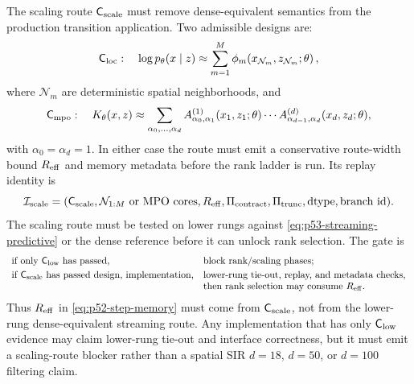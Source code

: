 \documentclass[11pt]{article}
\numberwithin{equation}{section}
\begin{document}
The scaling route \(\mathsf C_{\rm scale}\) must remove dense-equivalent
semantics from the production transition application.  Two admissible designs
are:
\begin{equation}
    \mathsf C_{\rm loc}:
    \quad
    \log p_\theta(x\mid z)
    \approx
    \sum_{m=1}^{M}
    \phi_m\!\left(x_{\mathcal N_m},z_{\mathcal N_m};\theta\right),
    \label{eq:p53-local-transition-factor}
\end{equation}
where \(\mathcal N_m\) are deterministic spatial neighborhoods, and
\begin{equation}
    \mathsf C_{\rm mpo}:
    \quad
    K_\theta(x,z)
    \approx
    \sum_{\alpha_0,\ldots,\alpha_d}
    A^{(1)}_{\alpha_0,\alpha_1}(x_1,z_1;\theta)
    \cdots
    A^{(d)}_{\alpha_{d-1},\alpha_d}(x_d,z_d;\theta),
    \label{eq:p53-mpo-transition-factor}
\end{equation}
with \(\alpha_0=\alpha_d=1\).  In either case the route must emit a conservative
route-width bound \(R_{\rm eff}\) and memory metadata before the rank ladder is
run.  Its replay identity is
\begin{equation}
    \mathcal I_{\rm scale}
    =
    (\mathsf C_{\rm scale}, \mathcal N_{1:M}\text{ or MPO cores},
     R_{\rm eff}, \Pi_{\rm contract}, \Pi_{\rm trunc},
     \text{dtype}, \text{branch id}).
    \label{eq:p53-scale-route-identity}
\end{equation}
The scaling route must be tested on lower rungs against
\eqref{eq:p53-streaming-predictive} or the dense reference before it can unlock
rank selection.  The gate is
\begin{equation}
\begin{array}{ll}
\text{if only }\mathsf C_{\rm low}\text{ has passed,}
    & \text{block rank/scaling phases;}\\[1mm]
\text{if }\mathsf C_{\rm scale}\text{ has passed design, implementation,}
    & \text{lower-rung tie-out, replay, and metadata checks,}\\
    & \text{then rank selection may consume }R_{\rm eff}.
\end{array}
\label{eq:p53-scaling-route-gate}
\end{equation}
Thus \(R_{\rm eff}\) in \eqref{eq:p52-step-memory} must come from
\(\mathsf C_{\rm scale}\), not from the lower-rung dense-equivalent streaming
route.  Any implementation that has only \(\mathsf C_{\rm low}\) evidence may
claim lower-rung tie-out and interface correctness, but it must emit a
scaling-route blocker rather than a spatial SIR \(d=18\), \(d=50\), or
\(d=100\) filtering claim.
\end{document}
